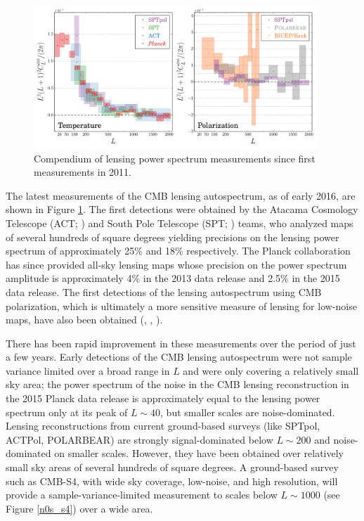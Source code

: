 \begin{figure}[htbp]
\centering
\includegraphics[width=0.95\textwidth]{CMBLensing/autoCompilationTP}
\caption{Compendium of lensing power spectrum measurements since first measurements in 2011.} 
\label{CMBLensPower}
\end{figure}

The latest measurements of the CMB lensing autospectrum, as of early 2016, are shown in Figure \ref{CMBLensPower}. The first detections were obtained by the Atacama Cosmology Telescope (ACT; \cite{Das:2011ak}) and South Pole Telescope  (SPT; \cite{vanEngelen:2012va}) teams, who analyzed maps of several hundreds of square degrees yielding precisions on the lensing power spectrum of approximately 25\% and 18\% respectively.  The Planck collaboration has since provided all-sky lensing maps whose precision on the power spectrum amplitude is approximately 4\% in the 2013 data release and 2.5\% in the 2015 data release.  The first detections of the lensing autospectrum using CMB polarization, which is ultimately a more sensitive measure of lensing for low-noise maps,  have also been obtained (\cite{Ade:2013gez}, \cite{Story:2014hni}, \cite{Array:2016afx}).

There has been rapid improvement in these measurements over the period of just a few years. 
Early detections of the CMB lensing autospectrum were not sample variance limited over a broad range in $L$ and were only covering a relatively small sky area;  
the  power spectrum of the noise in the CMB lensing reconstruction in the 2015 Planck data release is approximately equal to the lensing power spectrum only at its peak of $L \sim 40$, but smaller scales are noise-dominated. Lensing reconstructions from current ground-based surveys (like SPTpol, ACTPol, POLARBEAR) 
are strongly signal-dominated below $L \sim 200$ and noise-dominated on smaller scales.  However, they have been obtained over relatively small sky areas of several hundreds of square degrees. A ground-based survey such as CMB-S4, with wide sky coverage, low-noise, and high resolution, will provide a sample-variance-limited measurement to scales below $L \sim 1000$ (see Figure \ref{n0s_s4}) over a wide area.   
 

